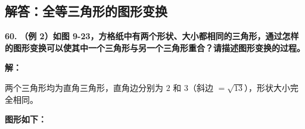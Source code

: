 \newpage

\newpage

\subsection{解答：全等三角形的图形变换}

\vspace{0.6cm}

\textbf{\LARGE 60.} \textbf{（例 2）如图 9-23，方格纸中有两个形状、大小都相同的三角形，通过怎样的图形变换可以使其中一个三角形与另一个三角形重合？请描述图形变换的过程。}

\vspace{0.4cm}
\textbf{解：}

两个三角形均为直角三角形，直角边分别为 $2$ 和 $3$（斜边 $= \sqrt{13}$），形状大小完全相同。

\textbf{图形如下：}

